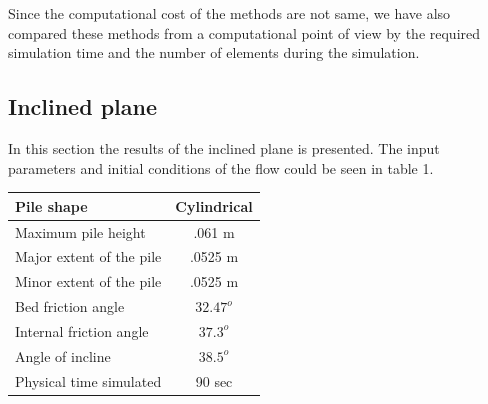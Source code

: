 \documentclass[letterpaper,10pt]{article}
\begin{document}
Since the computational cost of the methods are not same, we have also compared these methods from a computational point of view by the required simulation time and the number of elements 
during the simulation. 

\subsection{Inclined plane}
In this section the results of the inclined plane is presented. The input parameters and initial conditions of the flow could be seen in  table 1.
\begin{center}
        \begin{tabular}{|l|c|}
                \hline
                Pile shape       & Cylindrical \\
                \hline
                Maximum pile height       & .061 m \\
                \hline
                Major extent of the pile  & .0525 m \\
                \hline
                Minor extent of the pile  & .0525 m \\
                \hline           
                Bed friction angle        & $32.47^o$ \\
                \hline
                Internal friction angle  & $37.3^o$ \\
                \hline
                Angle of incline          & $38.5^o$ \\
                \hline
                Physical time simulated   &  90 sec \\
                \hline
        \end{tabular}
\end{center}
\end{document}
